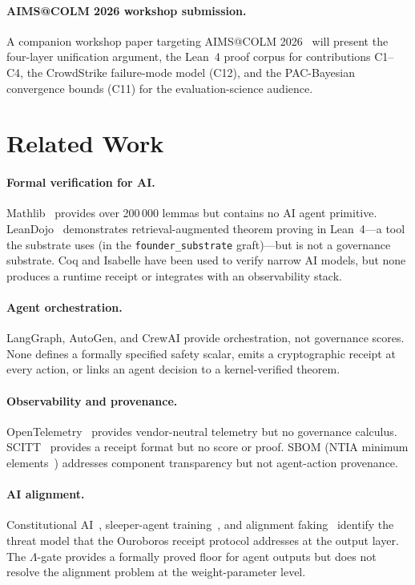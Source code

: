 \documentclass[11pt,letterpaper]{article}
\theoremstyle{definition}
\theoremstyle{remark}
\begin{document}
\paragraph{AIMS@COLM 2026 workshop submission.}
A companion workshop paper targeting
AIMS@COLM 2026~\cite{AIMS2026COLM} will present the four-layer
unification argument, the Lean~4 proof corpus for contributions
C1--C4, the CrowdStrike failure-mode model (C12), and the
PAC-Bayesian convergence bounds (C11) for the evaluation-science
audience.

\section{Related Work}
\label{sec:related}

\paragraph{Formal verification for AI.}
Mathlib~\cite{Avigad2024} provides over 200\,000 lemmas but contains no
AI agent primitive.
LeanDojo~\cite{Yang2024LeanDojo} demonstrates retrieval-augmented
theorem proving in Lean~4---a tool the substrate uses (in the
\texttt{founder\_substrate} graft)---but is not a governance substrate.
Coq and Isabelle have been used to verify narrow AI models, but none
produces a runtime receipt or integrates with an observability stack.

\paragraph{Agent orchestration.}
LangGraph, AutoGen, and CrewAI provide orchestration, not governance
scores.
None defines a formally specified safety scalar, emits a
cryptographic receipt at every action, or links an agent decision to a
kernel-verified theorem.

\paragraph{Observability and provenance.}
OpenTelemetry~\cite{OTel2023} provides vendor-neutral telemetry but
no governance calculus.
SCITT~\cite{IETF2024SCITT} provides a receipt format but no score or
proof.
SBOM (NTIA minimum elements~\cite{NTIA2021SBOM}) addresses component
transparency but not agent-action provenance.

\paragraph{AI alignment.}
Constitutional AI~\cite{Anthropic2022Constitutional},
sleeper-agent training~\cite{Hubinger2024}, and alignment
faking~\cite{Greenblatt2024} identify the threat model that the
Ouroboros receipt protocol addresses at the output layer.
The \(\Lambda\)-gate provides a formally proved floor for agent
outputs but does not resolve the alignment problem at the
weight-parameter level.
\end{document}
